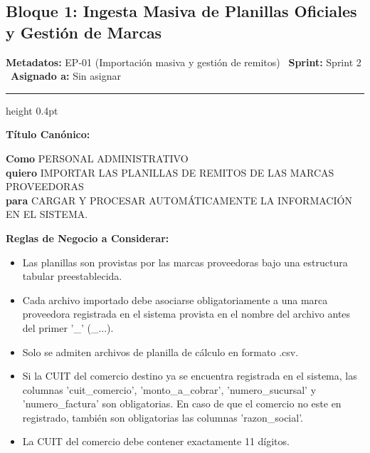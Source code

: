 \documentclass[a4paper,9pt]{article}
\begin{document}
\subsection{Bloque 1: Ingesta Masiva de Planillas Oficiales y Gestión de Marcas}

\begin{tcolorbox}[hucard, title={\textbf{HU-2: IMPORTAR PLANILLA DE REMITOS} \hfill \scriptsize \colorbox{tealstatus}{\textbf{\ Accepted\ }} \quad \colorbox{white}{\textcolor{primarydark}{\textbf{\ 5 pts\ }}}}]
\vspace{-1pt}
\noindent\textbf{\footnotesize Metadatos:} EP-01 (Importación masiva y gestión de remitos) \textbar\ \textbf{Sprint:} Sprint 2 \textbar\ \textbf{Asignado a:} Sin asignar\par\vspace{2pt}
\hrule height 0.4pt\par\vspace{3pt}
\noindent\textbf{\footnotesize Título Canónico:}\par\vspace{1pt}
{\small \textbf{Como} PERSONAL ADMINISTRATIVO \\ \textbf{quiero} IMPORTAR LAS PLANILLAS DE REMITOS DE LAS MARCAS PROVEEDORAS \\ \textbf{para} CARGAR Y PROCESAR AUTOMÁTICAMENTE LA INFORMACIÓN EN EL SISTEMA.}\par\vspace{3pt}
\noindent\textbf{\footnotesize Reglas de Negocio a Considerar:}\par\vspace{1pt}
{\footnotesize
\begin{itemize}[leftmargin=12pt, nosep, itemsep=1.5pt, topsep=1pt]
\item Las planillas son provistas por las marcas proveedoras bajo una estructura tabular preestablecida.
\item Cada archivo importado debe asociarse obligatoriamente a una marca proveedora registrada en el sistema provista en el nombre del archivo antes del primer '\_' (\_...).
\item Solo se admiten archivos de planilla de cálculo en formato .csv.
\item Si la CUIT del comercio destino ya se encuentra registrada en el sistema, las columnas 'cuit\_comercio', 'monto\_a\_cobrar', 'numero\_sucursal' y 'numero\_factura' son obligatorias. En caso de que el comercio no este en registrado, también son obligatorias las columnas 'razon\_social'.
\item La CUIT del comercio debe contener exactamente 11 dígitos.

\end{itemize}}
\end{tcolorbox}
\end{document}
